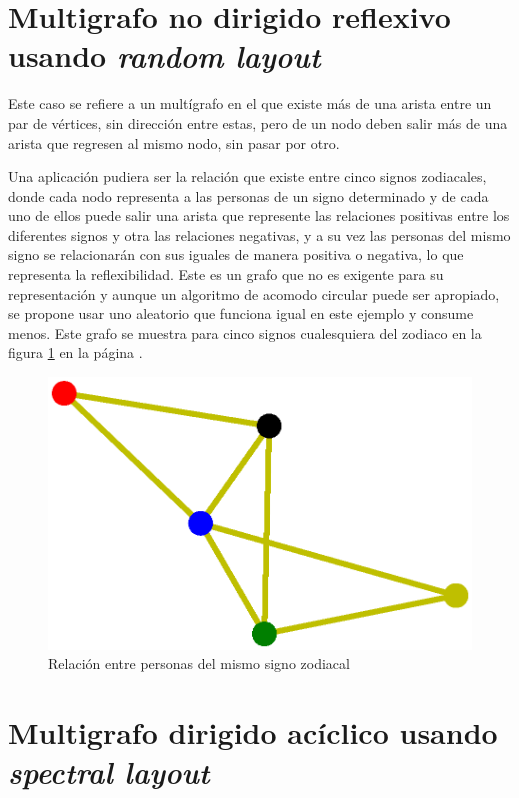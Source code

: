 \documentclass{article}
\begin{document}
\section{Multigrafo no dirigido reflexivo usando \textit{random layout}}

Este caso se refiere a un multígrafo en el que existe más de una arista entre un par de vértices, sin dirección entre estas, pero de un nodo deben salir más de una arista que regresen al mismo nodo, sin pasar por otro.

Una aplicación pudiera ser la relación que existe entre cinco signos zodiacales, donde cada nodo representa a las personas de un signo determinado y de cada uno de ellos puede salir una arista que represente las relaciones positivas entre los diferentes signos y otra las relaciones negativas, y a su vez las personas del mismo signo se relacionarán con sus iguales de manera positiva o negativa, lo que representa la reflexibilidad. Este es un grafo que no es exigente para su representación y aunque un algoritmo de acomodo circular puede ser apropiado, se propone usar uno aleatorio que funciona igual en este ejemplo y consume menos. Este grafo se muestra para cinco signos cualesquiera del zodiaco en la figura \ref{fig:Fig09} en la página \pageref{fig:Fig09}. 

\newpage


\begin{figure}[htbp]
    \centering
    \includegraphics[scale=0.6]{imagenes1/Fig09.eps}
    \caption{Relación entre personas del mismo signo zodiacal}
    \label{fig:Fig09}
\end{figure}

\section{Multigrafo dirigido acíclico usando \textit{spectral layout}}
\end{document}
